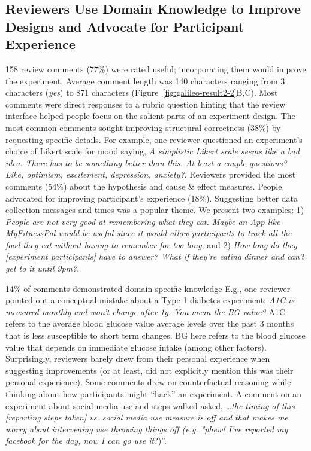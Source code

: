 \subsection{Reviewers Use Domain Knowledge to Improve Designs and Advocate for Participant Experience}
158 review comments (77\%) were rated useful; incorporating them would improve the experiment. Average comment length was 140 characters ranging from 3 characters (\textit{yes}) to 871 characters (Figure~\ref{fig:galileo-result2-2}B,C). Most comments were direct responses to a rubric question hinting that the review interface helped people focus on the salient parts of an experiment design.
The most common comments sought improving structural correctness (38\%) by requesting specific details. For example, one reviewer questioned an experiment's choice of Likert scale for mood saying, \textit{A simplistic Likert scale seems like a bad idea. There has to be something better than this. At least a couple questions? Like, optimism, excitement, depression, anxiety?}. Reviewers provided the most comments (54\%) about the hypothesis and cause \& effect measures. People advocated for improving participant's experience (18\%). Suggesting better data collection messages and times was a popular theme. We present two examples: 1) \textit{People are not very good at remembering what they eat. Maybe an App like MyFitnessPal would be useful since it would allow participants to track all the food they eat without having to remember for too long}, and 2) \textit{How long do they [experiment participants] have to answer? What if they're eating dinner and can't get to it until 9pm?}.

14\% of comments demonstrated domain-specific knowledge E.g., one reviewer pointed out a conceptual mistake about a Type-1 diabetes experiment: \textit{A1C is measured monthly and won't change after 1g. You mean the BG value?} A1C refers to the average blood glucose value average levels over the past 3 months that is less susceptible to short term changes. BG here refers to the blood glucose value that depends on immediate glucose intake (among other factors). Surprisingly, reviewers barely drew from their personal experience when suggesting improvements (or at least, did not explicitly mention this was their personal experience). Some comments drew on counterfactual reasoning while thinking about how participants might “hack” an experiment. A comment on an experiment about social media use and steps walked asked, \textit{…the timing of this [reporting steps taken] vs. social media use measure is off and that makes me worry about intervening use throwing things off (e.g. "phew! I've reported my facebook for the day, now I can go use it}?)”. 


